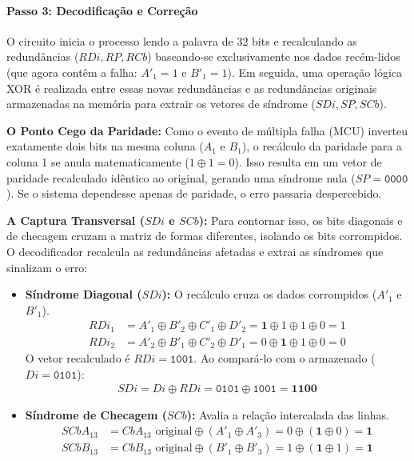 \documentclass[12pt,a4paper]{article}
\begin{document}
\paragraph{Passo 3: Decodificação e Correção}

O circuito inicia o processo lendo a palavra de 32 bits e recalculando as redundâncias ($RDi, RP, RCb$) baseando-se exclusivamente nos dados recém-lidos (que agora contêm a falha: $A'_1 = 1$ e $B'_1 = 1$). Em seguida, uma operação lógica XOR é realizada entre essas novas redundâncias e as redundâncias originais armazenadas na memória para extrair os vetores de síndrome ($SDi, SP, SCb$).

\textbf{O Ponto Cego da Paridade:} 
Como o evento de múltipla falha (MCU) inverteu exatamente dois bits na mesma coluna ($A_1$ e $B_1$), o recálculo da paridade para a coluna 1 se anula matematicamente ($1 \oplus 1 = 0$). Isso resulta em um vetor de paridade recalculado idêntico ao original, gerando uma síndrome nula ($SP = \texttt{0000}$). Se o sistema dependesse apenas de paridade, o erro passaria despercebido.

\textbf{A Captura Transversal ($SDi$ e $SCb$):} 
Para contornar isso, os bits diagonais e de checagem cruzam a matriz de formas diferentes, isolando os bits corrompidos. O decodificador recalcula as redundâncias afetadas e extrai as síndromes que sinalizam o erro:
\begin{itemize}
    \item \textbf{Síndrome Diagonal ($SDi$):} O recálculo cruza os dados corrompidos ($A'_1$ e $B'_1$). 
    \begin{align*}
        RDi_1 &= A'_1 \oplus B'_2 \oplus C'_1 \oplus D'_2 = \mathbf{1} \oplus 1 \oplus 1 \oplus 0 = 1 \\
        RDi_2 &= A'_2 \oplus B'_1 \oplus C'_2 \oplus D'_1 = 0 \oplus \mathbf{1} \oplus 1 \oplus 0 = 0
    \end{align*}
    O vetor recalculado é $RDi = \texttt{1001}$. Ao compará-lo com o armazenado ($Di = \texttt{0101}$):
    \begin{align*}
        SDi = Di \oplus RDi = \texttt{0101} \oplus \texttt{1001} = \mathbf{1100}
    \end{align*}
    
    \item \textbf{Síndrome de Checagem ($SCb$):} Avalia a relação intercalada das linhas.
    \begin{align*}
        SCbA_{13} &= CbA_{13} \text{ original} \oplus (A'_1 \oplus A'_3) = 0 \oplus (\mathbf{1} \oplus 0) = \mathbf{1} \\
        SCbB_{13} &= CbB_{13} \text{ original} \oplus (B'_1 \oplus B'_3) = 1 \oplus (\mathbf{1} \oplus 1) = \mathbf{1}
    \end{align*}
\end{itemize}
\end{document}

